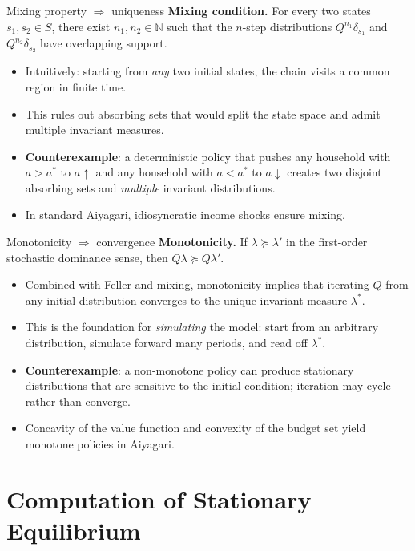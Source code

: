 \begin{frame}{Mixing property $\Rightarrow$ uniqueness}
\textbf{Mixing condition.} For every two states $s_1, s_2 \in S$, there exist $n_1, n_2 \in \mathbb{N}$ such that the $n$-step distributions $Q^{n_1}\delta_{s_1}$ and $Q^{n_2}\delta_{s_2}$ have overlapping support.
\medskip
\begin{itemize}
\item Intuitively: starting from \emph{any} two initial states, the chain visits a common region in finite time.
\medskip
\item This rules out absorbing sets that would split the state space and admit multiple invariant measures.
\medskip
\item \textbf{Counterexample}: a deterministic policy that pushes any household with $a > a^*$ to $a \uparrow$ and any household with $a < a^*$ to $a \downarrow$ creates two disjoint absorbing sets and \emph{multiple} invariant distributions.
\medskip
\item In standard Aiyagari, idiosyncratic income shocks ensure mixing.
\end{itemize}
\end{frame}

\begin{frame}{Monotonicity $\Rightarrow$ convergence}
\textbf{Monotonicity.} If $\lambda \succeq \lambda'$ in the first-order stochastic dominance sense, then $Q\lambda \succeq Q\lambda'$.
\medskip
\begin{itemize}
\item Combined with Feller and mixing, monotonicity implies that iterating $Q$ from any initial distribution converges to the unique invariant measure $\lambda^*$.
\medskip
\item This is the foundation for \emph{simulating} the model: start from an arbitrary distribution, simulate forward many periods, and read off $\lambda^*$.
\medskip
\item \textbf{Counterexample}: a non-monotone policy can produce stationary distributions that are sensitive to the initial condition; iteration may cycle rather than converge.
\medskip
\item Concavity of the value function and convexity of the budget set yield monotone policies in Aiyagari.
\end{itemize}
\end{frame}

\section{Computation of Stationary Equilibrium}

